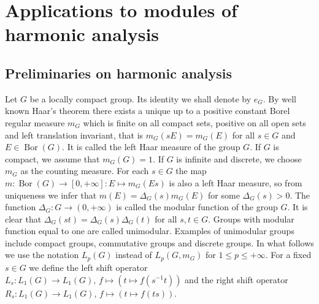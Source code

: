 
\section{
    Applications to modules of harmonic analysis}\label{
SectionApplicationsToModulesOfHarmonicAnalysis}


\subsection{
    Preliminaries on harmonic analysis}\label{
SectionPreliminariesOnHarmonicAnalysis} 

Let $G$ be a locally compact group. Its identity we shall denote by $e_G$. By
well known Haar's theorem \cite[section 15.8]{HewRossAbstrHarmAnalVol1} there
exists a unique up to a positive constant Borel regular measure $m_G$ which is
finite on all compact sets, positive on all open sets and left translation
invariant, that is $m_G(sE)=m_G(E)$ for all $s\in G$ and $E\in \operatorname{Bor}(G)$. It is
called the left Haar measure of the group $G$. If $G$ is compact, we assume that 
$m_G(G)=1$. If $G$ is infinite and discrete, we choose $m_G$ as the counting measure.
For each $s\in G$ the map $m:\operatorname{Bor}(G)\to[0,+\infty]:E\mapsto m_G(Es)$ is also a
left Haar measure, so from uniqueness we infer that $m(E)=\Delta_G(s)m_G(E)$ for
some $\Delta_G(s)>0$. The function $\Delta_G:G\to(0,+\infty)$ is called the
modular function of the group $G$. It is clear that
$\Delta_G(st)=\Delta_G(s)\Delta_G(t)$ for all $s,t\in G$. Groups with modular
function equal to one are called unimodular. Examples of unimodular groups 
include compact groups, commutative groups and discrete groups. In what
follows we use the notation $L_p(G)$ instead of $L_p(G,m_G)$ 
for $1\leq p\leq+\infty$. For a fixed $s\in G$ we define the left shift operator
$L_s:L_1(G)\to L_1(G),\, f\mapsto(t\mapsto f(s^{-1}t))$ and the right shift
operator $R_s:L_1(G)\to L_1(G),\, f\mapsto (t\mapsto f(ts))$. 

